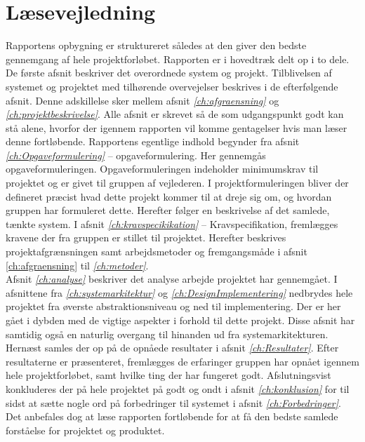 \section{Læsevejledning}
Rapportens opbygning er struktureret således at den giver den bedste gennemgang af hele projektforløbet. Rapporten er i hovedtræk delt op i to dele. De første afsnit beskriver det overordnede system og projekt. Tilblivelsen af systemet og projektet med tilhørende overvejelser beskrives i de efterfølgende afsnit. Denne adskillelse sker mellem afsnit \textit{\ref{ch:afgraensning}} og \textit{\ref{ch:projektbeskrivelse}}. Alle afsnit er skrevet så de som udgangspunkt godt kan stå alene, hvorfor der igennem rapporten vil komme gentagelser hvis man læser denne fortløbende. Rapportens egentlige indhold begynder fra afsnit \textit{\ref{ch:Opgaveformulering}} – opgaveformulering.  Her gennemgås opgaveformuleringen. Opgaveformuleringen indeholder minimumskrav til projektet og er givet til gruppen af vejlederen. I projektformuleringen bliver der defineret præcist hvad dette projekt kommer til at dreje sig om, og hvordan gruppen har formuleret dette. Herefter følger en beskrivelse af det samlede, tænkte system.
I afsnit \textit{\ref{ch:kravspecikikation}} – Kravspecifikation, fremlægges kravene der fra gruppen er stillet til projektet. Herefter beskrives projektafgrænsningen samt arbejdsmetoder og fremgangsmåde i afsnit \ref{ch:afgraensning} til \textit{\ref{ch:metoder}}.\\
Afsnit \textit{\ref{ch:analyse}} beskriver det analyse arbejde projektet har gennemgået. I afsnittene fra \textit{\ref{ch:systemarkitektur}} og \textit{\ref{ch:DesignImplementering}} nedbrydes hele projektet fra øverste abstraktionsniveau og ned til implementering. Der er her gået i dybden med de vigtige aspekter i forhold til dette projekt. Disse afsnit har samtidig også en naturlig overgang til hinanden ud fra systemarkitekturen. \\
Hernæst samles der op på de opnåede resultater i afsnit \textit{\ref{ch:Resultater}}. Efter resultaterne er præsenteret, fremlægges de erfaringer gruppen har opnået igennem hele projektforløbet, samt hvilke ting der har fungeret godt. Afslutningsvist konkluderes der på hele projektet på godt og ondt i afsnit \textit{\ref{ch:konklusion}} for til sidst at sætte nogle ord på forbedringer til systemet i afsnit \textit{\ref{ch:Forbedringer}}. Det anbefales dog at læse rapporten fortløbende for at få den bedste samlede forståelse for projektet og produktet.